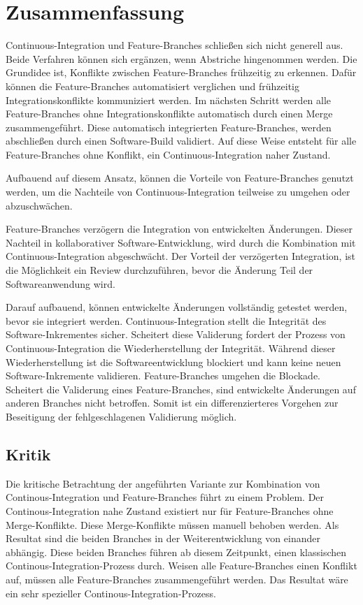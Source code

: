 \chapter{Zusammenfassung}

Continuous-Integration und Feature-Branches schließen sich nicht generell aus. Beide Verfahren können sich ergänzen, wenn Abstriche hingenommen werden. Die Grundidee ist, Konflikte zwischen Feature-Branches frühzeitig zu erkennen. Dafür können die Feature-Branches automatisiert verglichen und frühzeitig Integrationskonflikte kommuniziert werden. Im nächsten Schritt werden alle Feature-Branches ohne Integrationskonflikte automatisch durch einen Merge zusammengeführt. Diese automatisch integrierten Feature-Branches, werden abschließen durch einen Software-Build validiert. Auf diese Weise entsteht für alle Feature-Branches ohne Konflikt, ein Continuous-Integration naher Zustand.

Aufbauend auf diesem Ansatz, können die Vorteile von Feature-Branches genutzt werden, um die Nachteile von Continuous-Integration teilweise zu umgehen oder abzuschwächen.

Feature-Branches verzögern die Integration von entwickelten Änderungen. Dieser Nachteil in kollaborativer Software-Entwicklung, wird durch die Kombination mit Continuous-Integration abgeschwächt. Der Vorteil der verzögerten Integration, ist die Möglichkeit ein Review durchzuführen, bevor die Änderung Teil der Softwareanwendung wird. 

Darauf aufbauend, können entwickelte Änderungen vollständig getestet werden, bevor sie integriert werden. Continuous-Integration stellt die Integrität des Software-Inkrementes sicher. Scheitert diese Validerung fordert der Prozess von Continuous-Integration die Wiederherstellung der Integrität. Während dieser Wiederherstellung ist die Softwareentwicklung blockiert und kann keine neuen Software-Inkremente validieren. Feature-Branches umgehen die Blockade. Scheitert die Validerung eines Feature-Branches, sind entwickelte Änderungen auf anderen Branches nicht betroffen. Somit ist ein differenzierteres Vorgehen zur Beseitigung der fehlgeschlagenen Validierung möglich.

\section{Kritik}

Die kritische Betrachtung der angeführten Variante zur Kombination von Continous\hyp{}Integration und Feature-Branches führt zu einem Problem. Der Continous-Integration nahe Zustand existiert nur für Feature-Branches ohne Merge-Konflikte. Diese Merge-Konflikte müssen manuell behoben werden. Als Resultat sind die beiden Branches in der Weiterentwicklung von einander abhängig. Diese beiden Branches führen ab diesem Zeitpunkt, einen \glqq klassischen\grqq{} Continous-Integration-Prozess durch. Weisen alle Feature-Branches einen Konflikt auf, müssen alle Feature-Branches zusammengeführt werden. Das Resultat wäre ein \glqq sehr spezieller\grqq{} Continous-Integration-Prozess.

